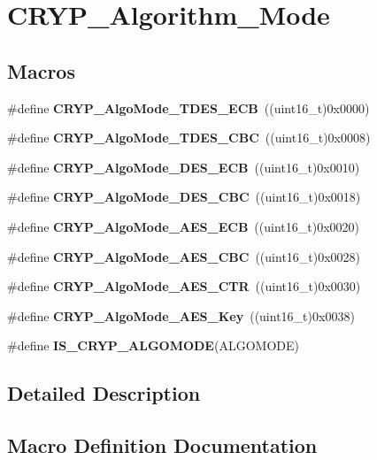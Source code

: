 \section{C\+R\+Y\+P\+\_\+\+Algorithm\+\_\+\+Mode}
\label{group__CRYP__Algorithm__Mode}
\subsection*{Macros}
\begin{DoxyCompactItemize}
\item 
\#define \textbf{ C\+R\+Y\+P\+\_\+\+Algo\+Mode\+\_\+\+T\+D\+E\+S\+\_\+\+E\+CB}~((uint16\+\_\+t)0x0000)
\item 
\#define \textbf{ C\+R\+Y\+P\+\_\+\+Algo\+Mode\+\_\+\+T\+D\+E\+S\+\_\+\+C\+BC}~((uint16\+\_\+t)0x0008)
\item 
\#define \textbf{ C\+R\+Y\+P\+\_\+\+Algo\+Mode\+\_\+\+D\+E\+S\+\_\+\+E\+CB}~((uint16\+\_\+t)0x0010)
\item 
\#define \textbf{ C\+R\+Y\+P\+\_\+\+Algo\+Mode\+\_\+\+D\+E\+S\+\_\+\+C\+BC}~((uint16\+\_\+t)0x0018)
\item 
\#define \textbf{ C\+R\+Y\+P\+\_\+\+Algo\+Mode\+\_\+\+A\+E\+S\+\_\+\+E\+CB}~((uint16\+\_\+t)0x0020)
\item 
\#define \textbf{ C\+R\+Y\+P\+\_\+\+Algo\+Mode\+\_\+\+A\+E\+S\+\_\+\+C\+BC}~((uint16\+\_\+t)0x0028)
\item 
\#define \textbf{ C\+R\+Y\+P\+\_\+\+Algo\+Mode\+\_\+\+A\+E\+S\+\_\+\+C\+TR}~((uint16\+\_\+t)0x0030)
\item 
\#define \textbf{ C\+R\+Y\+P\+\_\+\+Algo\+Mode\+\_\+\+A\+E\+S\+\_\+\+Key}~((uint16\+\_\+t)0x0038)
\item 
\#define \textbf{ I\+S\+\_\+\+C\+R\+Y\+P\+\_\+\+A\+L\+G\+O\+M\+O\+DE}(A\+L\+G\+O\+M\+O\+DE)
\end{DoxyCompactItemize}


\subsection{Detailed Description}


\subsection{Macro Definition Documentation}
\mbox{\label{group__CRYP__Algorithm__Mode_ga323e924328e277dc86d4d12711671f89}} 
